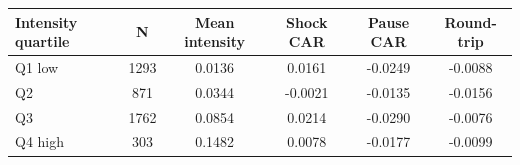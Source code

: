 \begin{tabular}{lccccc}
\toprule
Intensity quartile & N & Mean intensity & Shock CAR & Pause CAR & Round-trip \\
\midrule
Q1 low & 1293 & 0.0136 & 0.0161 & -0.0249 & -0.0088 \\
Q2 & 871 & 0.0344 & -0.0021 & -0.0135 & -0.0156 \\
Q3 & 1762 & 0.0854 & 0.0214 & -0.0290 & -0.0076 \\
Q4 high & 303 & 0.1482 & 0.0078 & -0.0177 & -0.0099 \\
\bottomrule
\end{tabular}